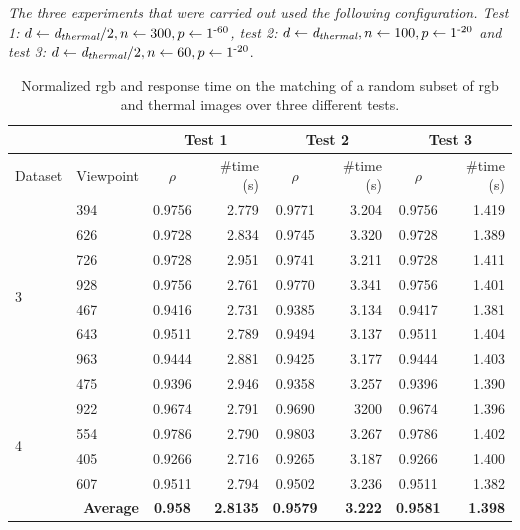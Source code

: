 \textit{The three experiments that were carried out used the following configuration. Test 1: $d \gets \textit{d}_{\textit{thermal}} / 2, n \gets 300, p \gets 1\textsuperscript{-60}$, test 2: $d \gets \textit{d}_{\textit{thermal}}, n \gets 100, p \gets 1\textsuperscript{-20}$ and test 3: $d \gets \textit{d}_{\textit{thermal}} / 2, n \gets 60, p \gets 1\textsuperscript{-20}$}.

\renewcommand{\arraystretch}{1.15}
\begin{table}[ht]
    \small
    \caption{Normalized \acrshort{rgb} and response time on the matching of a random subset of \acrshort{rgb} and thermal images over three different tests.}
    \label{table:thermal_rgb_correlation}
    \begin{tabular}{ll|cr|cr|cr}
        \toprule
        \multicolumn{2}{c}{} & \multicolumn{2}{c}{Test 1} & \multicolumn{2}{c}{Test 2} & \multicolumn{2}{c}{Test 3}\\
        \toprule
        Dataset & Viewpoint & $\rho$ & \#time (\si{\second}) & $\rho$ & \#time (\si{\second}) & $\rho$ & \#time (\si{\second})\\
        \cmidrule{1-8}
        \multirow{8}{*}{3} & 394 & 0.9756 & 2.779 & 0.9771 & 3.204 & 0.9756 & 1.419\\
        & 626 & 0.9728 & 2.834 & 0.9745 & 3.320 & 0.9728 & 1.389\\
        & 726 & 0.9728 & 2.951 & 0.9741 & 3.211 & 0.9728 & 1.411\\ 
        & 928 & 0.9756 & 2.761 & 0.9770 & 3.341 & 0.9756 & 1.401\\
        & 467 & 0.9416 & 2.731 & 0.9385 & 3.134 & 0.9417 & 1.381\\
        & 643 & 0.9511 & 2.789 & 0.9494 & 3.137 & 0.9511 & 1.404\\ 
        & 963 & 0.9444 & 2.881 & 0.9425 & 3.177 & 0.9444 & 1.403\\
        & 475 & 0.9396 & 2.946 & 0.9358 & 3.257 & 0.9396 & 1.390\\
        \cmidrule{1-8}
        \multirow{4}{*}{4} & 922 & 0.9674 & 2.791 & 0.9690 & 3200 & 0.9674 & 1.396\\
        & 554 & 0.9786 & 2.790 & 0.9803 & 3.267 & 0.9786 & 1.402\\
        & 405 & 0.9266 & 2.716 & 0.9265 & 3.187 & 0.9266 & 1.400\\
        & 607 & 0.9511 & 2.794 & 0.9502 & 3.236 & 0.9511 & 1.382\\
        \cmidrule{1-8}
        \multicolumn{2}{r|}{\textbf{Average}} & \textbf{0.958} & \textbf{2.8135} & \textbf{0.9579} & \textbf{3.222} & \textbf{0.9581} & \textbf{1.398}\\
        \bottomrule
    \end{tabular}
    \normalsize
\end{table}
\renewcommand{\arraystretch}{1}

